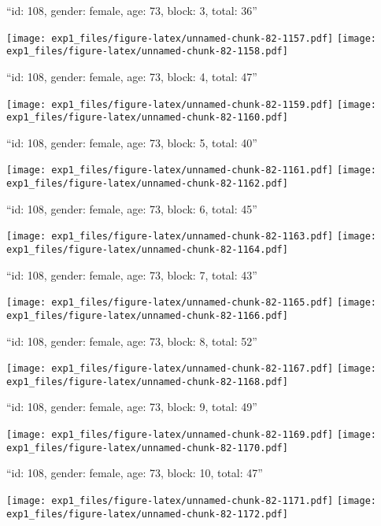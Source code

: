 \documentclass[11pt,,]{article}
\begin{document}
\newpage
[1] 

``id: 108, gender: female, age: 73, block: 3, total: 36''

\texttt{[image: exp1\_files/figure-latex/unnamed-chunk-82-1157.pdf]}
\texttt{[image: exp1\_files/figure-latex/unnamed-chunk-82-1158.pdf]}

\newpage
[1] 

``id: 108, gender: female, age: 73, block: 4, total: 47''

\texttt{[image: exp1\_files/figure-latex/unnamed-chunk-82-1159.pdf]}
\texttt{[image: exp1\_files/figure-latex/unnamed-chunk-82-1160.pdf]}

\newpage
[1] 

``id: 108, gender: female, age: 73, block: 5, total: 40''

\texttt{[image: exp1\_files/figure-latex/unnamed-chunk-82-1161.pdf]}
\texttt{[image: exp1\_files/figure-latex/unnamed-chunk-82-1162.pdf]}

\newpage
[1] 

``id: 108, gender: female, age: 73, block: 6, total: 45''

\texttt{[image: exp1\_files/figure-latex/unnamed-chunk-82-1163.pdf]}
\texttt{[image: exp1\_files/figure-latex/unnamed-chunk-82-1164.pdf]}

\newpage
[1] 

``id: 108, gender: female, age: 73, block: 7, total: 43''

\texttt{[image: exp1\_files/figure-latex/unnamed-chunk-82-1165.pdf]}
\texttt{[image: exp1\_files/figure-latex/unnamed-chunk-82-1166.pdf]}

\newpage
[1] 

``id: 108, gender: female, age: 73, block: 8, total: 52''

\texttt{[image: exp1\_files/figure-latex/unnamed-chunk-82-1167.pdf]}
\texttt{[image: exp1\_files/figure-latex/unnamed-chunk-82-1168.pdf]}

\newpage
[1] 

``id: 108, gender: female, age: 73, block: 9, total: 49''

\texttt{[image: exp1\_files/figure-latex/unnamed-chunk-82-1169.pdf]}
\texttt{[image: exp1\_files/figure-latex/unnamed-chunk-82-1170.pdf]}

\newpage
[1] 

``id: 108, gender: female, age: 73, block: 10, total: 47''

\texttt{[image: exp1\_files/figure-latex/unnamed-chunk-82-1171.pdf]}
\texttt{[image: exp1\_files/figure-latex/unnamed-chunk-82-1172.pdf]}
\end{document}
